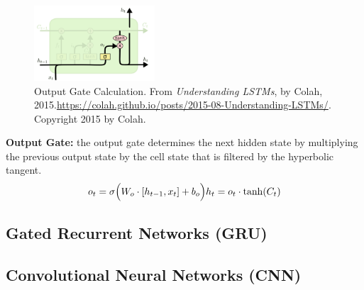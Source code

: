 \begin{program}
\begin{figure}
\vspace{5pt}
\centering
\includegraphics[width=0.4\textwidth]{imgs/lstm_outputGate.png}
\vspace{-20pt}
\caption{\footnotesize Output Gate Calculation. From \emph{Understanding LSTMs}, by Colah, 2015.\url{https://colah.github.io/posts/2015-08-Understanding-LSTMs/}. Copyright 2015 by Colah.}
\vspace{5pt}
\end{figure}

\textbf{Output Gate: }the output gate determines the next hidden state by multiplying the previous output state by the cell state that is filtered by the hyperbolic tangent. 
$$
o_t = \sigma \Big( W_o \cdot [h_{t-1}, x_t] + b_o \Big) \\
h_t = o_t \cdot \tanh(C_t)
$$
\end{program}






\subsection{Gated Recurrent Networks (GRU)}

\subsection{Convolutional Neural Networks (CNN)}